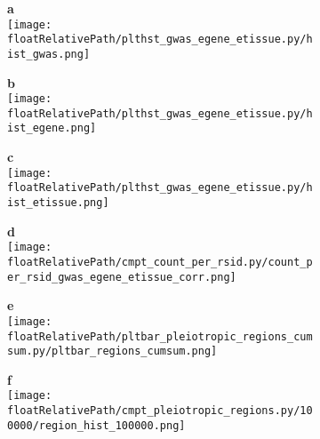 \begin{figure}[!ht]
    \centering

    \begin{subfigure}[]{.49\textwidth}
        \textbf{a}
        \\
        \texttt{[image: \\floatRelativePath/plthst\_gwas\_egene\_etissue.py/hist\_gwas.png]}
    \end{subfigure}
    \begin{subfigure}[]{.49\textwidth}
        \textbf{b}
        \\
        \texttt{[image: \\floatRelativePath/plthst\_gwas\_egene\_etissue.py/hist\_egene.png]}
    \end{subfigure}

    \begin{subfigure}[]{.49\textwidth}
        \textbf{c}
        \\
        \texttt{[image: \\floatRelativePath/plthst\_gwas\_egene\_etissue.py/hist\_etissue.png]}
    \end{subfigure}
    \begin{subfigure}[]{.49\textwidth}
        \textbf{d}
        \\
        \texttt{[image: \\floatRelativePath/cmpt\_count\_per\_rsid.py/count\_per\_rsid\_gwas\_egene\_etissue\_corr.png]}
    \end{subfigure}

    \begin{subfigure}[]{.49\textwidth}
        \textbf{e}
        \\
        \texttt{[image: \\floatRelativePath/pltbar\_pleiotropic\_regions\_cumsum.py/pltbar\_regions\_cumsum.png]}
    \end{subfigure}
    \begin{subfigure}[]{.49\textwidth}
        \textbf{f}
        \\
        \texttt{[image: \\floatRelativePath/cmpt\_pleiotropic\_regions.py/100000/region\_hist\_100000.png]}
    \end{subfigure}

    \caption{}

\end{figure}

%
%

